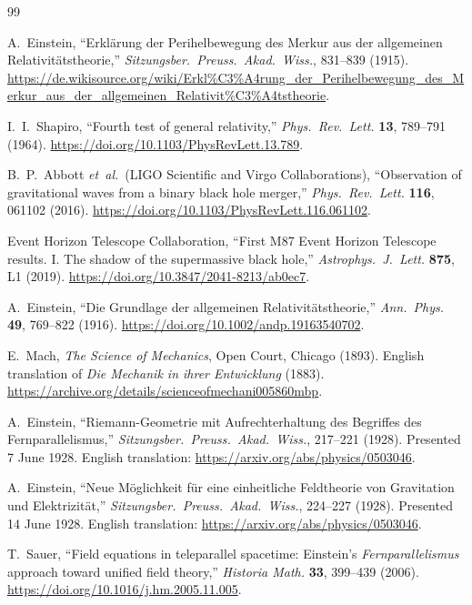 \documentclass[a4paper]{article}
\begin{document}
\restoregeometry
\clearpage
\begin{thebibliography}{99}
\raggedright

A.~Einstein,
``Erkl\"arung der Perihelbewegung des Merkur aus der allgemeinen Relativit\"atstheorie,''
\textit{Sitzungsber.\ Preuss.\ Akad.\ Wiss.}, 831--839 (1915).
\url{https://de.wikisource.org/wiki/Erkl%C3%A4rung_der_Perihelbewegung_des_Merkur_aus_der_allgemeinen_Relativit%C3%A4tstheorie}.

I.~I.~Shapiro,
``Fourth test of general relativity,''
\textit{Phys.\ Rev.\ Lett.} \textbf{13}, 789--791 (1964).
\url{https://doi.org/10.1103/PhysRevLett.13.789}.

B.~P.~Abbott \textit{et~al.}\ (LIGO Scientific and Virgo Collaborations),
``Observation of gravitational waves from a binary black hole merger,''
\textit{Phys.\ Rev.\ Lett.} \textbf{116}, 061102 (2016).
\url{https://doi.org/10.1103/PhysRevLett.116.061102}.

Event Horizon Telescope Collaboration,
``First M87 Event Horizon Telescope results. I. The shadow of the supermassive black hole,''
\textit{Astrophys.\ J.\ Lett.} \textbf{875}, L1 (2019).
\url{https://doi.org/10.3847/2041-8213/ab0ec7}.

A.~Einstein,
``Die Grundlage der allgemeinen Relativit\"atstheorie,''
\textit{Ann.\ Phys.} \textbf{49}, 769--822 (1916).
\url{https://doi.org/10.1002/andp.19163540702}.

E.~Mach,
\textit{The Science of Mechanics},
Open Court, Chicago (1893).
English translation of \textit{Die Mechanik in ihrer Entwicklung} (1883).
\url{https://archive.org/details/scienceofmechani005860mbp}.

A.~Einstein,
``Riemann-Geometrie mit Aufrechterhaltung des Begriffes des Fernparallelismus,''
\textit{Sitzungsber.\ Preuss.\ Akad.\ Wiss.}, 217--221 (1928).
Presented 7 June 1928.
English translation:
\url{https://arxiv.org/abs/physics/0503046}.

A.~Einstein,
``Neue M\"oglichkeit f\"ur eine einheitliche Feldtheorie von Gravitation und Elektrizit\"at,''
\textit{Sitzungsber.\ Preuss.\ Akad.\ Wiss.}, 224--227 (1928).
Presented 14 June 1928.
English translation:
\url{https://arxiv.org/abs/physics/0503046}.

T.~Sauer,
``Field equations in teleparallel spacetime: Einstein's \emph{Fernparallelismus} approach toward unified field theory,''
\textit{Historia Math.} \textbf{33}, 399--439 (2006).
\url{https://doi.org/10.1016/j.hm.2005.11.005}.


\end{thebibliography}
\end{document}
